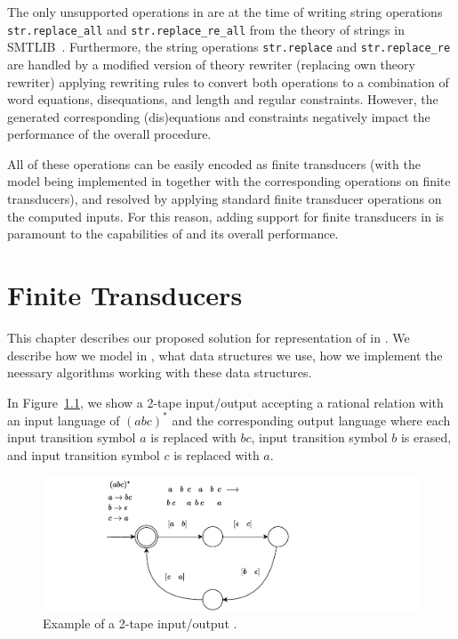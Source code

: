 The only unsupported operations in \noodler are at the time of writing string operations \texttt{str.replace\_all} and \texttt{str.replace\_re\_all} from the theory of strings in SMTLIB~\cite{smtlib_theory_strings}.
Furthermore, the string operations \texttt{str.replace} and \texttt{str.replace\_re} are handled by a modified \noodler version of theory rewriter (replacing \ziii own theory rewriter) applying rewriting rules to convert both operations to a combination of word equations, disequations, and length and regular constraints.
However, the generated corresponding (dis)equations and constraints negatively impact the performance of the overall procedure.

All of these operations can be easily encoded as finite transducers (with the model being implemented in \mata together with the corresponding operations on finite transducers), and resolved by applying standard finite transducer operations on the computed inputs.
For this reason, adding support for finite transducers in \mata is paramount to the capabilities of \noodler and its overall performance.

\chapter{Finite Transducers}

This chapter describes our proposed solution for representation of \nfts in \mata. We describe how we model \nfts in \mata, what data structures we use, how we implement the neessary algorithms working with these data structures.

\begin{example}\label{example:2_tape_nft}
In Figure~\ref{fig:2_tape_nft}, we show a 2-tape input/output \nft accepting a rational relation with an input language of $(abc)^*$ and the corresponding output language where each input transition symbol $a$ is replaced with $bc$, input transition symbol $b$ is erased, and input transition symbol $c$ is replaced with $a$.

\begin{figure}[!ht]
  \centering
  \includegraphics[scale=1.0, keepaspectratio]{obrazky-figures/transducer.drawio.pdf}
  \caption{
    Example of a 2-tape input/output \nft.
  }\label{fig:2_tape_nft}
\end{figure}

\end{example}

